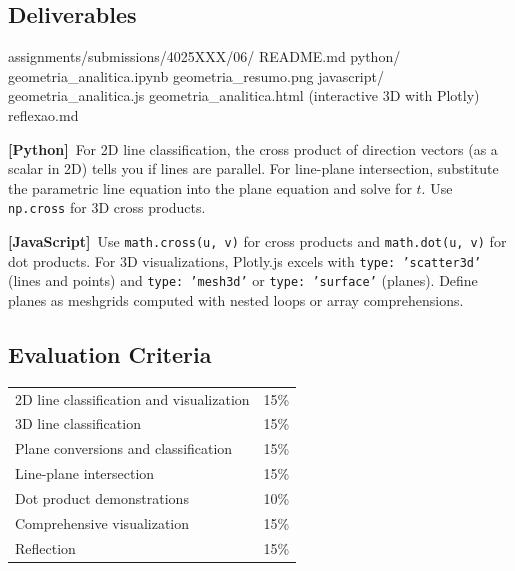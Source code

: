 \documentclass[a4paper,11pt]{article}
\newcommand{\pylabel}{\textcolor{pyborder}{\textbf{[Python]}}}
\newcommand{\jslabel}{\textcolor{jsborder}{\textbf{[JavaScript]}}}
\begin{document}
\subsection{Deliverables}

\begin{code}
assignments/submissions/4025XXX/06/
  README.md
  python/
    geometria_analitica.ipynb
    geometria_resumo.png
  javascript/
    geometria_analitica.js
    geometria_analitica.html    (interactive 3D with Plotly)
  reflexao.md
\end{code}

\begin{hintbox}
  \pylabel\ For 2D line classification, the cross product of direction vectors (as a scalar in 2D) tells you if lines are parallel. For line-plane intersection, substitute the parametric line equation into the plane equation and solve for $t$. Use \texttt{np.cross} for 3D cross products.

  \medskip

  \jslabel\ Use \texttt{math.cross(u, v)} for cross products and \texttt{math.dot(u, v)} for dot products. For 3D visualizations, Plotly.js excels with \texttt{type: 'scatter3d'} (lines and points) and \texttt{type: 'mesh3d'} or \texttt{type: 'surface'} (planes). Define planes as meshgrids computed with nested loops or array comprehensions.
\end{hintbox}

\subsection{Evaluation Criteria}

\begin{tabularx}{\textwidth}{X r}
  2D line classification and visualization & 15\% \\
  3D line classification & 15\% \\
  Plane conversions and classification & 15\% \\
  Line-plane intersection & 15\% \\
  Dot product demonstrations & 10\% \\
  Comprehensive visualization & 15\% \\
  Reflection & 15\% \\
\end{tabularx}

\newpage
\end{document}
